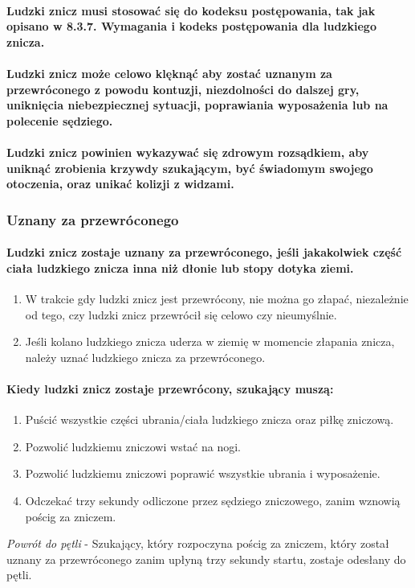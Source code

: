 \documentclass[12pt]{article}
\begin{document}
\paragraph{Ludzki znicz musi stosować się do kodeksu
postępowania, tak jak opisano w 8.3.7. Wymagania i kodeks postępowania
dla ludzkiego znicza.}

\paragraph{Ludzki znicz może celowo klęknąć aby zostać uznanym za
przewróconego z powodu kontuzji, niezdolności do dalszej gry, uniknięcia
niebezpiecznej sytuacji, poprawiania wyposażenia lub na polecenie
sędziego.}

\paragraph{Ludzki znicz powinien wykazywać się zdrowym
rozsądkiem, aby uniknąć zrobienia krzywdy szukającym, być świadomym
swojego otoczenia, oraz unikać kolizji z widzami.}

\subsubsection{Uznany za przewróconego}

\paragraph{Ludzki znicz zostaje uznany za przewróconego, jeśli
jakakolwiek część ciała ludzkiego znicza inna niż dłonie lub stopy
dotyka ziemi.}

\begin{enumerate}
\item W trakcie gdy ludzki znicz jest przewrócony, nie można go złapać,
niezależnie od tego, czy ludzki znicz przewrócił się celowo czy
nieumyślnie.

\item Jeśli kolano ludzkiego znicza uderza w ziemię w momencie złapania
znicza, należy uznać ludzkiego znicza za przewróconego.
\end{enumerate}

\paragraph{Kiedy ludzki znicz zostaje przewrócony, szukający
muszą:}

\begin{enumerate}
\item Puścić wszystkie części ubrania/ciała ludzkiego znicza oraz piłkę
zniczową.

\item Pozwolić ludzkiemu zniczowi wstać na nogi.

\item Pozwolić ludzkiemu zniczowi poprawić wszystkie ubrania i wyposażenie.

\item Odczekać trzy sekundy odliczone przez sędziego zniczowego, zanim
wznowią pościg za zniczem.
\end{enumerate}

\emph{Powrót do pętli} - Szukający, który rozpoczyna pościg za zniczem,
który został uznany za przewróconego zanim upłyną trzy sekundy startu,
zostaje odesłany do pętli.
\end{document}
